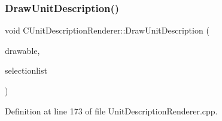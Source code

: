 \hypertarget{classCUnitDescriptionRenderer_a129cfc5d3942ebc37b9ca51530bf4daa}{}\label{classCUnitDescriptionRenderer_a129cfc5d3942ebc37b9ca51530bf4daa} 
\subsubsection{\texorpdfstring{Draw\+Unit\+Description()}{DrawUnitDescription()}}
{\footnotesize\ttfamily void C\+Unit\+Description\+Renderer\+::\+Draw\+Unit\+Description (\begin{DoxyParamCaption}\item[{Gdk\+Drawable $\ast$}]{drawable,  }\item[{const std\+::list$<$ std\+::weak\+\_\+ptr$<$ \hyperlink{classCPlayerAsset}{C\+Player\+Asset} $>$ $>$ \&}]{selectionlist }\end{DoxyParamCaption})}



Definition at line 173 of file Unit\+Description\+Renderer.\+cpp.


